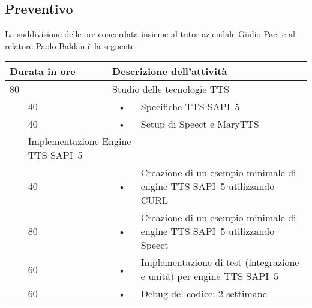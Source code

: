 \subsection{Preventivo}

La suddivisione delle ore concordata insieme al tutor aziendale Giulio Paci e al relatore Paolo Baldan è la seguente:

\begin{center}
	
	\begin{tabular} {|l|l|c p{10cm}|}
		\hline
		\multicolumn{2}{|l|}{\textbf{Durata in ore}}		&	\multicolumn{2}{l|}{\textbf{Descrizione dell'attività}}\\
		\hline
		\multicolumn{2}{|l|}{80}	&	\multicolumn{2}{l|}{Studio delle tecnologie TTS}\\
		\hline
		\multirow{3}{1cm}{ }    &            40            &            \hspace{5mm}•\hspace{2mm}            &  Specifiche TTS SAPI~5\\
		\cline{2-2}
		&            40            &            \hspace{5mm}•\hspace{2mm}            &            Setup di Speect e MaryTTS\\
		\hline
		
		\multicolumn{2}{|l|}{240}	&	\multicolumn{2}{l|}{Implementazione Engine TTS SAPI~5}\\
		\hline
		
		\multirow{3}{1cm}{ }    &            40            &            \hspace{5mm}•\hspace{2mm}            & Creazione di un esempio minimale di engine TTS SAPI~5 utilizzando CURL \\
		\cline{2-2}
		&            80            &            \hspace{5mm}•\hspace{2mm}            &            Creazione di un esempio minimale di engine TTS SAPI~5 utilizzando Speect \\
		\cline{2-2}
		&            60            &            \hspace{5mm}•\hspace{2mm}            &            Implementazione di test (integrazione e unità) per engine TTS SAPI~5 \\
		\cline{2-2}
		&            60            &            \hspace{5mm}•\hspace{2mm}            &            Debug del codice: 2 settimane \\
		\hline
	\end{tabular}
	
\end{center}

